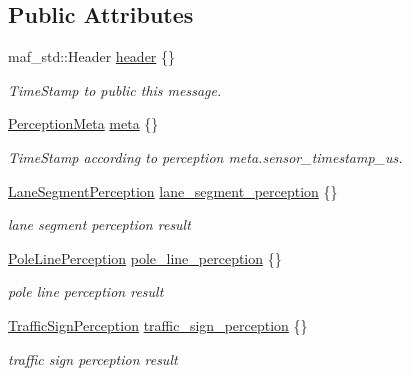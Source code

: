 \subsection*{Public Attributes}
\begin{DoxyCompactItemize}
\item 
maf\+\_\+std\+::\+Header \hyperlink{structmaf__perception__interface_1_1MLocPerception_a4bb78dfac8897349f8123e3c60fff67d}{header} \{\}
\begin{DoxyCompactList}\small\item\em Time\+Stamp to public this message. \end{DoxyCompactList}\item 
\hyperlink{structmaf__perception__interface_1_1PerceptionMeta}{Perception\+Meta} \hyperlink{structmaf__perception__interface_1_1MLocPerception_ac78bfbcc787aeb98103a2a8d48134a8a}{meta} \{\}
\begin{DoxyCompactList}\small\item\em Time\+Stamp according to perception meta.\+sensor\+\_\+timestamp\+\_\+us. \end{DoxyCompactList}\item 
\hyperlink{structmaf__perception__interface_1_1LaneSegmentPerception}{Lane\+Segment\+Perception} \hyperlink{structmaf__perception__interface_1_1MLocPerception_a2fc7b472821da6cd31886ebd81ecf751}{lane\+\_\+segment\+\_\+perception} \{\}
\begin{DoxyCompactList}\small\item\em lane segment perception result \end{DoxyCompactList}\item 
\hyperlink{structmaf__perception__interface_1_1PoleLinePerception}{Pole\+Line\+Perception} \hyperlink{structmaf__perception__interface_1_1MLocPerception_a4e5ff959824cc7f74084b703c717d1e8}{pole\+\_\+line\+\_\+perception} \{\}
\begin{DoxyCompactList}\small\item\em pole line perception result \end{DoxyCompactList}\item 
\hyperlink{structmaf__perception__interface_1_1TrafficSignPerception}{Traffic\+Sign\+Perception} \hyperlink{structmaf__perception__interface_1_1MLocPerception_ab38184ea4a795a529e3ce944f0d82c0a}{traffic\+\_\+sign\+\_\+perception} \{\}
\begin{DoxyCompactList}\small\item\em traffic sign perception result \end{DoxyCompactList}\end{DoxyCompactItemize}


